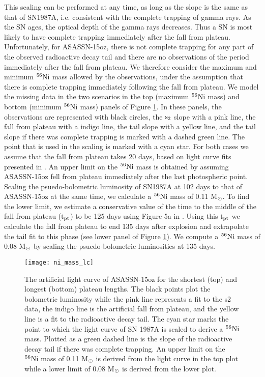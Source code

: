 \documentclass[a4paper,fleqn,usenatbib]{mnras}
\newcommand{\msun}{M$\rm{_{\odot}}$ }
\newcommand{\msunperiod}{M$\rm{_{\odot}}$}
\begin{document}
This scaling can be performed at any time, as long as the slope is the same as that of SN1987A, i.e. consistent with the complete trapping of gamma rays.
As the SN ages, the optical depth of the gamma rays decreases.
Thus a SN is most likely to have complete trapping immediately after the fall from plateau. 
Unfortunately, for ASASSN-15oz, there is not complete trapping for any part of the observed radioactive decay tail and there are no observations of the period immediately after the fall from plateau. 
We therefore consider the maximum and minimum $\rm{{}^{56}Ni}$ mass allowed by the observations, under the assumption that there is complete trapping immediately following the fall from plateau. 
We model the missing data in the two scenarios in the top (maximum $\rm{{}^{56}Ni}$ mass) and bottom (minimum $\rm{{}^{56}Ni}$ mass) panels of Figure \ref{fig:Ni}.
In these panels, the observations are represented with black circles, the $\rm{s_{2}}$ slope with a pink line, the fall from plateau with a indigo line, the tail slope with a yellow line, and the tail slope if there was complete trapping is marked with a dashed green line. 
The point that is used in the scaling is marked with a cyan star.
For both cases we assume that the fall from plateau takes 20 days, based on light curve fits presented in \citet{2016valenti}. 
An upper limit on the $\rm{{}^{56}Ni}$ mass is obtained by assuming ASASSN-15oz fell from plateau immediately after the last photospheric point.
Scaling the psuedo-bolometric luminosity of SN1987A at 102 days to that of ASASSN-15oz at the same time, we calculate a $\rm{{}^{56}Ni}$ mass of 0.11 \msunperiod.
To find the lower limit, we estimate a conservative value of the time to the middle of the fall from plateau ($\rm{t_{pt}}$) to be 125 days using Figure 5a in \citet{2016valenti}.
Using this $\rm{t_{pt}}$ we calculate the fall from plateau to end 135 days after explosion and extrapolate the tail fit to this phase (see lower panel of Figure \ref{fig:Ni}). 
We compute a $\rm{{}^{56}Ni}$ mass of 0.08 \msun by scaling the psuedo-bolometric luminosities at 135 days.
\begin{figure}
\begin{center}
\texttt{[image: ni\_mass\_lc]} %
\caption{The artificial light curve of ASASSN-15oz for the shortest (top) and longest (bottom) plateau lengths. 
The black points plot the bolometric luminosity while the pink line represents a fit to the s2 data, the indigo line is the artificial fall from plateau, and the yellow line is a fit to the radioactive decay tail.
The cyan star marks the point to which the light curve of SN 1987A is scaled to derive a $\rm{{}^{56}Ni}$ mass. 
Plotted as a green dashed line is the slope of the radioactive decay tail if there was complete trapping.
An upper limit on the $\rm{{}^{56}Ni}$ mass of 0.11 \msun is derived from the light curve in the top plot while a lower limit of 0.08 \msun is derived from the lower plot. }
\label{fig:Ni}
\end{center}
\end{figure}
\end{document}
